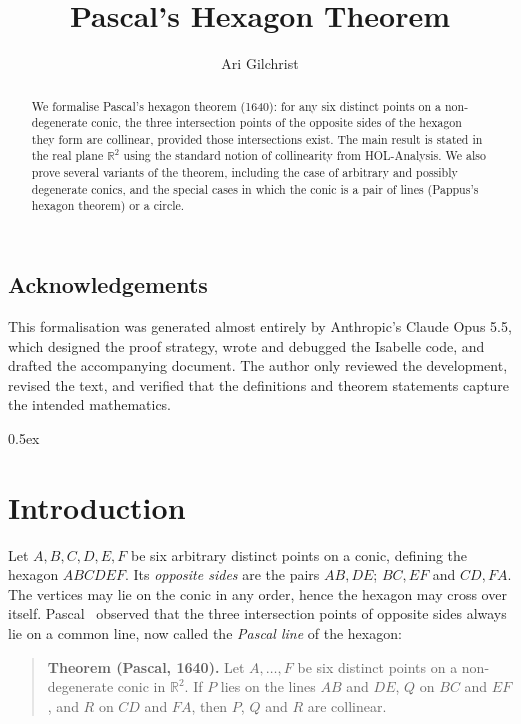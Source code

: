 \documentclass[11pt,a4paper]{article}
\begin{document}
\title{Pascal's Hexagon Theorem}
\author{Ari Gilchrist}
\maketitle

\begin{abstract}
  We formalise Pascal's hexagon theorem (1640): for any six distinct points on a
  non-degenerate conic, the three intersection points of the opposite sides of the hexagon
  they form are collinear, provided those intersections exist.
  The main result is stated in the real plane $\mathbb{R}^2$ using the standard notion of
  collinearity from HOL-Analysis. We also prove several variants of the theorem,
  including the case of arbitrary and possibly degenerate conics, and the special cases in which
  the conic is a pair of lines (Pappus's hexagon theorem) or a circle.
\end{abstract}

\subsection*{Acknowledgements}
This formalisation was generated almost entirely by Anthropic's Claude
Opus 5.5, which designed the proof strategy, wrote and debugged the Isabelle code, and
drafted the accompanying document. The author only reviewed the development,
revised the text, and verified that the definitions and theorem statements capture the intended
mathematics.

\tableofcontents

\parindent 0pt\parskip 0.5ex

\section{Introduction}

Let $A, B, C, D, E, F$ be six arbitrary distinct points on a conic, defining the
hexagon $ABCDEF$. Its \emph{opposite sides} are the pairs $AB, DE$; $BC, EF$ and $CD, FA$.
The vertices may lie on the conic in any order, hence the hexagon may cross over itself.
Pascal~\cite{pascal1640} observed that the three intersection points of opposite
sides always lie on a common line, now called the \emph{Pascal line} of the hexagon:

\begin{quote}
  \textbf{Theorem (Pascal, 1640).} Let $A, \dots, F$ be six distinct points on a
  non-degenerate conic in $\mathbb{R}^2$. If $P$ lies on the lines $AB$ and $DE$, $Q$ on
  $BC$ and $EF$, and $R$ on $CD$ and $FA$, then $P$, $Q$ and $R$ are collinear.
\end{quote}
\end{document}
